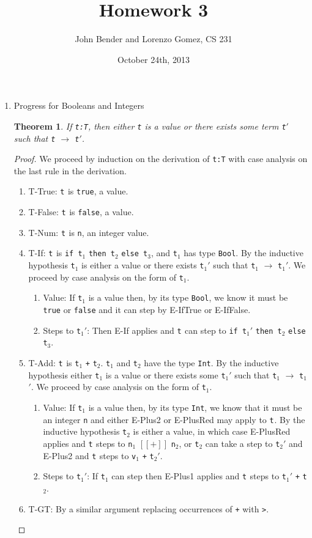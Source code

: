 \documentclass{article}
\title{Homework 3}
\author{John Bender and Lorenzo Gomez, CS 231}
\date{October 24th, 2013}
\newcommand{\step}[2]{{\tt #1} $\longrightarrow$ {\tt #2}}
\newcommand{\term}[1]{{\tt t$_{#1}$}}
\newtheorem{theorem}{Theorem}
\begin{document}
\maketitle

\begin{enumerate}
  \item Progress for Booleans and Integers

    \begin{theorem}
      If \verb|t:T|, then either \verb|t| is a value or there exists some term \verb|t|$'$ such that \verb|t| $\longrightarrow$ \verb|t|$'$.
    \end{theorem}

    \begin{proof}
      We proceed by induction on the derivation of \verb|t:T| with case analysis on the last rule in the derivation.
      \begin{enumerate}
        \item T-True: \term{} is \verb|true|, a value.
        \item T-False: \term{} is \verb|false|, a value.
        \item T-Num: \term{} is \verb|n|, an integer value.
        \item T-If: \term{} is \verb|if t|$_1$ \verb|then t|$_2$ \verb|else t|$_3$, and \term{1} has type \verb|Bool|. By the inductive hypothesis \term{1} is either a value or there exists \term{1}$'$ such that \step{t$_1$}{\term{1}$'$}. We proceed by case analysis on the form of \term{1}.
          \begin{enumerate}
            \item Value: If \term{1} is a value then, by its type \verb|Bool|, we know it must be \verb|true| or \verb|false| and it can step by E-IfTrue or E-IfFalse.
            \item Steps to \term{1}$'$: Then E-If applies and \term{} can step to \verb|if t|$_1'$ \verb|then t|$_2$ \verb|else t|$_3$.
          \end{enumerate}
        \item T-Add: \term{} is \term{1} \verb|+| \term{2}. \term{1} and \term{2} have the type \verb|Int|. By the inductive hypothesis either \term{1} is a value or there exists some \term{1}$'$ such that \step{t$_1$}{\term{1}$'$}. We proceed by case analysis on the form of \term{1}.
          \begin{enumerate}
            \item Value: If \term{1} is a value then, by its type \verb|Int|, we know that it must be an integer \verb|n| and either E-Plus2 or E-PlusRed may apply to \term{}. By the inductive hypothesis \term{2} is either a value, in which case E-PlusRed applies and \term{} steps to \verb|n|$_1$ $[[+]]$ \verb|n|$_2$, or \term{2} can take a step to \term{2}$'$ and E-Plus2 and \term{} steps to \verb|v|$_1$ \verb|+| \term{2}$'$.
            \item Steps to \term{1}$'$: If \term{1} can step then E-Plus1 applies and \term{} steps to \term{1}$'$ \verb|+| \term{2}.
          \end{enumerate}
        \item T-GT: By a similar argument replacing occurrences of \verb|+| with \verb|>|.


\end{enumerate}
\end{proof}
\end{enumerate}
\end{document}

